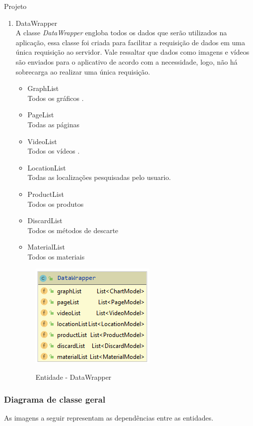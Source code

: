 \documentclass[
	12pt,				%
	openright,			%
	twoside,			%
	a4paper,			%
	english,			%
	french,				%
	spanish,			%
	brazil				%
	]{abntex2}
\begin{document}
\begin{chapter}{Projeto}
\begin{enumerate}
\item{DataWrapper}   \\ A classe \textit{DataWrapper} engloba todos os dados que serão utilizados na aplicação, essa classe foi criada para facilitar a requisição de dados em uma única requisição ao servidor. Vale ressaltar que dados como imagens e vídeos são enviados para o aplicativo de acordo com a necessidade, logo, não há sobrecarga ao realizar uma única requisição.
\newline
  \begin{itemize}
  \item{GraphList}\\ Todos os gráficos .
       \item{PageList}\\  Todas as páginas 
         \item{VideoList}\\ Todos os vídeos
         . \item{LocationList}\\ Todas as localizações pesquisadas pelo usuario.
         \item{ProductList}\\  Todos os produtos
         \item{DiscardList}\\ Todos os métodos de descarte 
         \item{MaterialList}\\  Todos os materiais
         
\end{itemize}
\begin{figure}[h]
\centering
   \caption{Entidade - DataWrapper}
   \includegraphics[scale=1.0]{media/DataWrapperModel.png}
     \label{fig:datawrapper}
\end{figure}
\end{enumerate}

\newpage
\subsubsection{Diagrama de classe geral}
As imagens a seguir representam as dependências entre as entidades.


\end{chapter}
\end{document}
